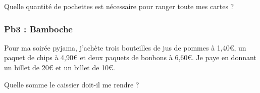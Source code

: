 Quelle quantité de pochettes est nécessaire pour ranger toute mes cartes ?

\Pointilles[6]


\subsubsection*{Pb3 : Bamboche} 

Pour ma soirée pyjama, j'achète trois bouteilles de jus de pommes à 1,40€, un paquet de chips à 4,90€ et deux paquets de bonbons à 6,60€. Je paye en donnant un billet de 20€ et un billet de 10€. 

Quelle somme le caissier doit-il me rendre ?

\Pointilles[6]



